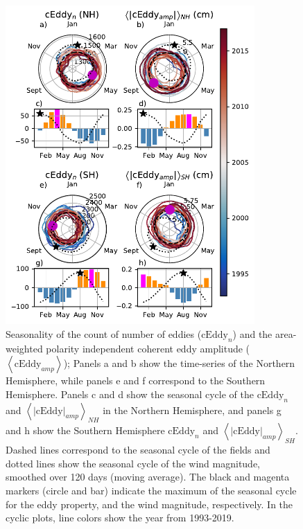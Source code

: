 \documentclass[draft,linenumbers]{agujournal2019}
\newcommand{\cEddy}{\textrm{cEddy}}
\begin{document}

	\begin{figure}
	    \centering
	    \includegraphics[width=95mm]{figures/All_polar_plots_eddy_stats_polarity_V3.pdf}
	    \caption{
		Seasonality of the count of number of eddies ($\cEddy
		_n$) and the area-weighted polarity independent coherent eddy amplitude ($\left<\cEddy_{amp}\right>$); Panels a and b show the time-series of the Northern Hemisphere, while panels e and f correspond to the Southern Hemisphere. Panels c and d show the seasonal cycle of the $\cEddy_n$ and $\left<|\cEddy|_{amp}\right>_{NH}$ in the Northern Hemisphere, and panels g and h show the Southern Hemisphere $\cEddy_n$ and $\left<|\cEddy|_{amp}\right>_{SH}$.
		Dashed lines correspond to the seasonal cycle of the fields and dotted lines show the seasonal cycle of the wind magnitude, smoothed over 120 days (moving average). 
		The black and magenta markers (circle and bar) indicate the maximum of the seasonal cycle for the eddy property, and the wind magnitude, respectively. In the cyclic plots, line colors show the year from 1993-2019.}
	    \label{fig:eddy_stats}
	\end{figure}
\end{document}

